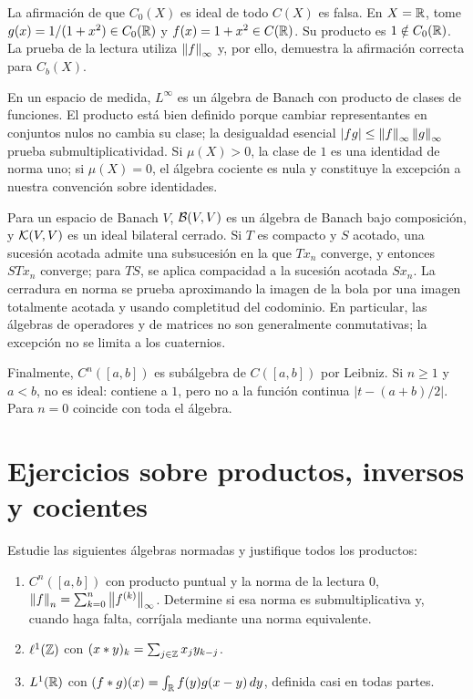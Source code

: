 \begin{observacion}
La afirmación de que $C_0(X)$ es ideal de todo $C(X)$ es falsa. En $X=\mathbb R$, tome $g(x)=1/(1+x^2)\in C_0(\mathbb R)$ y $f(x)=1+x^2\in C(\mathbb R)$. Su producto es $1\notin C_0(\mathbb R)$. La prueba de la lectura utiliza $\left\lVert f\right\rVert_\infty$ y, por ello, demuestra la afirmación correcta para $C_b(X)$.
\end{observacion}

En un espacio de medida, $L^\infty$ es un álgebra de Banach con producto de clases de funciones. El producto está bien definido porque cambiar representantes en conjuntos nulos no cambia su clase; la desigualdad esencial $|fg|\leq\left\lVert f\right\rVert_\infty\left\lVert g\right\rVert_\infty$ prueba submultiplicatividad. Si $\mu(X)>0$, la clase de $1$ es una identidad de norma uno; si $\mu(X)=0$, el álgebra cociente es nula y constituye la excepción a nuestra convención sobre identidades.

Para un espacio de Banach $V$, $\mathcal B(V,V)$ es un álgebra de Banach bajo composición, y $\mathcal K(V,V)$ es un ideal bilateral cerrado. Si $T$ es compacto y $S$ acotado, una sucesión acotada admite una subsucesión en la que $Tx_n$ converge, y entonces $STx_n$ converge; para $TS$, se aplica compacidad a la sucesión acotada $Sx_n$. La cerradura en norma se prueba aproximando la imagen de la bola por una imagen totalmente acotada y usando completitud del codominio. En particular, las álgebras de operadores y de matrices no son generalmente conmutativas; la excepción no se limita a los cuaternios.

Finalmente, $C^n([a,b])$ es subálgebra de $C([a,b])$ por Leibniz. Si $n\geq1$ y $a<b$, no es ideal: contiene a $1$, pero no a la función continua $|t-(a+b)/2|$. Para $n=0$ coincide con toda el álgebra.

\section{Ejercicios sobre productos, inversos y cocientes}

\begin{ejercicio}\label{ej:v3-l19-1}
Estudie las siguientes álgebras normadas y justifique todos los productos:
\begin{enumerate}
\item $C^n([a,b])$ con producto puntual y la norma de la lectura 0, $\left\lVert f\right\rVert_n=\sum_{k=0}^n\left\lVert f^{(k)}\right\rVert_\infty$. Determine si esa norma es submultiplicativa y, cuando haga falta, corríjala mediante una norma equivalente.
\item $\ell^1(\mathbb Z)$ con $(x*y)_k=\sum_{j\in\mathbb Z}x_jy_{k-j}$.
\item $L^1(\mathbb R)$ con $(f*g)(x)=\int_\mathbb R f(y)g(x-y)\,dy$, definida casi en todas partes.
\end{enumerate}
\end{ejercicio}


